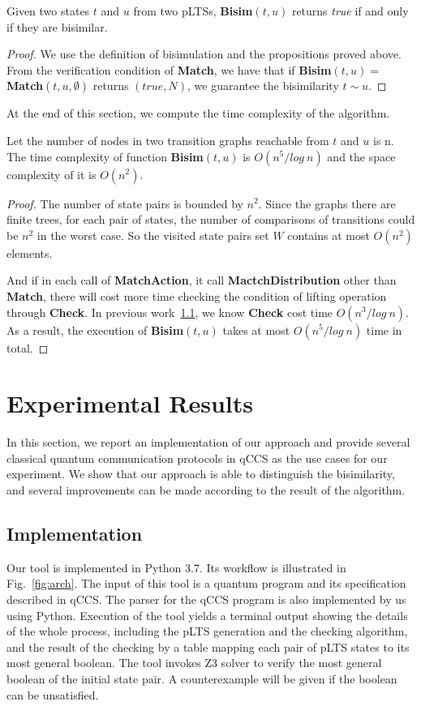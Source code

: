\documentclass[a4paper,UKenglish,cleveref, autoref]{lipics-v2019}
\begin{document}
\begin{theorem}[Correctness]

Given two states $t$ and $u$ from two pLTSs, \textbf{Bisim}$(t,u)$ returns \textit{true} if and only if they are bisimilar.
\end{theorem} 
\begin{proof}
We use the definition of bisimulation and the propositions proved above. From the verification condition of \textbf{Match}, we have that if
\textbf{Bisim}$(t,u)=$\textbf{Match}$(t,u,\emptyset)$ 
returns $(true, N)$, we guarantee the bisimilarity $t\sim u$.
\end{proof}

At the end of this section, we compute the time complexity of the algorithm.

\begin{theorem}[Complexity]
Let the number of nodes in two transition graphs reachable from $t$ and $u$ is n. The time complexity of function \textbf{Bisim}$(t,u)$ is $O(n^5/log\ n)$ and the space complexity of it is $O(n^2)$.
\end{theorem}
\begin{proof}
 The number of state pairs is bounded by $n^2$. Since the graphs there are finite trees, for each pair of states, the number of comparisons of transitions could be $n^2$ in the worst case. So the visited state pairs set $W$ contains at most $O(n^2)$ elements.

And if in each call of \textbf{MatchAction}, it call \textbf{MactchDistribution} other than \textbf{Match}, there will cost more time checking the condition of lifting operation through \textbf{Check}. In previous work~\ref{}, we know \textbf{Check} cost time $O(n^3/log\ n)$. As a result, the execution of \textbf{Bisim}$(t,u)$ takes at most $O(n^5/log\ n)$ time in total.
\end{proof}

\section{Experimental Results}
In this section, we report an implementation of our approach and provide several classical quantum communication protocols in qCCS as the use cases for our experiment. We show that our approach is able to distinguish the bisimilarity, and several improvements can be made according to the result of the algorithm.
\subsection{Implementation}
Our tool is implemented in Python 3.7. Its workflow is illustrated in Fig.~\ref{fig:arch}. The input of this tool is a quantum program and its specification described in qCCS. The parser for the qCCS program is also implemented by us using Python. Execution of the tool yields a terminal output showing the details of the whole process, including the pLTS generation and the checking algorithm, and the result of the checking by a table mapping each pair of pLTS states to its most general boolean. The tool invokes Z3 solver to verify the most general boolean of the initial state pair. A counterexample will be given if the boolean can be unsatisfied.
\end{document}
